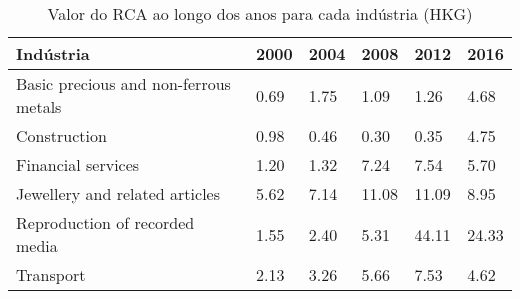 \begin{table}
\centering
\caption{Valor do RCA ao longo dos anos para cada indústria (HKG)}
\begin{tabular}{p{6cm}p{1.5cm}p{1.5cm}p{1.5cm}p{1.5cm}p{1.5cm}}
\toprule
                            Indústria & 2000 & 2004 &  2008 &  2012 &  2016 \\
\midrule
Basic precious and non-ferrous metals & 0.69 & 1.75 &  1.09 &  1.26 &  4.68 \\
                         Construction & 0.98 & 0.46 &  0.30 &  0.35 &  4.75 \\
                   Financial services & 1.20 & 1.32 &  7.24 &  7.54 &  5.70 \\
       Jewellery and related articles & 5.62 & 7.14 & 11.08 & 11.09 &  8.95 \\
       Reproduction of recorded media & 1.55 & 2.40 &  5.31 & 44.11 & 24.33 \\
                            Transport & 2.13 & 3.26 &  5.66 &  7.53 &  4.62 \\
\bottomrule
\end{tabular}
\end{table}
